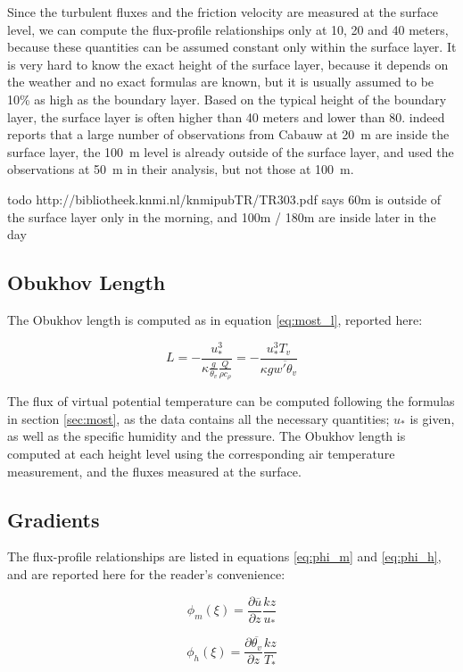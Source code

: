\documentclass[12pt]{book}
\begin{document}
Since the turbulent fluxes and the friction velocity are measured at the surface level, we can compute the flux-profile relationships only at 10, 20 and 40 meters, because these quantities can be assumed constant only within the surface layer. It is very hard to know the exact height of the surface layer, because it depends on the weather and no exact formulas are known, but it is usually assumed to be 10\% as high as the boundary layer. Based on the typical height of the boundary layer, the surface layer is often higher than 40 meters and lower than 80. \cite{cabauw_z0} indeed reports that a large number of observations from Cabauw at \SI{20}{\meter} are inside the surface layer, the \SI{100}{\meter} level is already outside of the surface layer, and \cite{boulder} used the observations at \SI{50}{\meter} in their analysis, but not those at \SI{100}{\meter}.

todo http://bibliotheek.knmi.nl/knmipubTR/TR303.pdf says 60m is outside of the surface layer only in the morning, and 100m / 180m are inside later in the day

\subsection{Obukhov Length}

The Obukhov length is computed as in equation \ref{eq:most_l}, reported here:

$$
L=-\frac{u_*^3}{\kappa\frac{g}{\theta_v}\frac{Q}{\rho c_\rho}}
=-\frac{u_*^3 T_v}{\kappa g \overline{w'\theta_v}}
$$

The flux of virtual potential temperature can be computed following the formulas in section \ref{sec:most}, as the data contains all the necessary quantities; $u_*$ is given, as well as the specific humidity and the pressure. The Obukhov length is computed at each height level using the corresponding air temperature measurement, and the fluxes measured at the surface.


\subsection{Gradients}
\label{sec:gradients}
The flux-profile relationships are listed in equations \ref{eq:phi_m} and \ref{eq:phi_h}, and are reported here for the reader's convenience:

$$
\phi_m(\xi)=\frac{\partial\overline{u}}{\partial z}\frac{kz}{u_*}
$$

$$
\phi_h(\xi)=\frac{\partial\overline{\theta_v}}{\partial z}\frac{kz}{T_*}
$$
\end{document}
